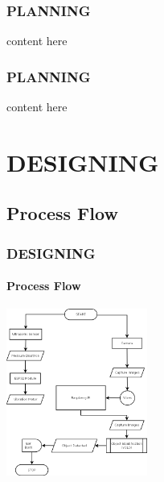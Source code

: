 \documentclass[
	11pt, %
	aspectratio=169, %
]{beamer}
\begin{document}


\begin{frame}
	\frametitle{PLANNING}
	content here
\end{frame}

\begin{frame}
	\frametitle{PLANNING}
	content here
\end{frame}

\section{DESIGNING}

\subsection{Process Flow}
\begin{frame}
	\frametitle{DESIGNING}
	\framesubtitle{Process Flow} %
	\centering
	\includegraphics[width=175px]{flowchart.png}
\end{frame}
\end{document}
